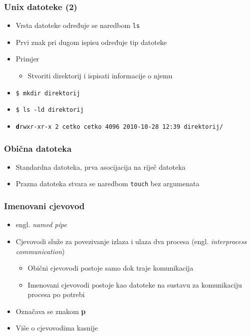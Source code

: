 \documentclass{beamer}
\newcommand{\shell}[1]{\texttt{\small #1}}
\begin{document}
\begin{frame}[t]
\frametitle{Unix datoteke (2)}
\begin{itemize}
  \item Vrsta datoteke određuje se naredbom \shell{ls}
  \item Prvi znak pri dugom ispisu određuje tip datoteke
  \item Primjer
  \begin{itemize}
    \item Stvoriti direktorij i ispisati informacije o njemu
  \end{itemize}
  \item[] \shell{\$ mkdir direktorij}
  \item[] \shell{\$ ls -ld direktorij}
  \item[] \shell{\footnotesize\textbf{d}rwxr-xr-x 2 cetko cetko 4096
                          2010-10-28 12:39 direktorij/}
\end{itemize}
\end{frame}

\begin{frame}[t]
\frametitle{Obična datoteka}
\begin{itemize}
  \item Standardna datoteka, prva asocijacija na riječ datoteka
  \item Prazna datoteka stvara se naredbom \shell{touch} bez argumenata
\end{itemize}
\end{frame}


\begin{frame}[t]
\frametitle{Imenovani cjevovod}
\begin{itemize}
  \item engl. \emph{named pipe}
  \item Cjevovodi služe za povezivanje izlaza i ulaza dva procesa (engl.
        \emph{interprocess communication})
  \begin{itemize}
    \item Obični cjevovodi postoje samo dok traje komunikacija
    \item Imenovani cjevovodi postoje kao datoteke na sustavu za
          komunikaciju procesa po potrebi
  \end{itemize}
  \item Označava se znakom \textbf{p}
  \item Više o cjevovodima kasnije
\end{itemize}
\end{frame}
\end{document}
